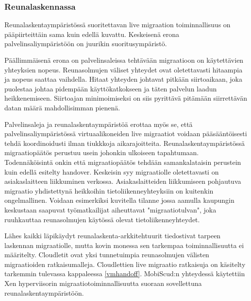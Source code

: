 \subsubsection*{Reunalaskennassa}
Reunalaskentaympäristössä suoritettavan live migraation toiminnallisuus on pääpiirteittäin sama kuin edellä kuvattu. Keskeisenä erona palvelinsaliympäristöön on juurikin suoritusympäristö. 

Päällimmäisenä erona on palvelinsaleissa tehtävään migraatioon on käytettävien yhteyksien nopeus. Reunasolmujen väliset yhteydet ovat oletettavasti hitaampia ja nopeus saattaa vaihdella\cite{ha2017you}.
Hitaat yhteyden johtavat pitkään siirtoaikaan, joka puolestaa johtaa pidempään käyttökatkokseen ja täten palvelun laadun heikkenemiseen.
Siirtoajan minimoimiseksi on siis pyrittävä pitämään siirrettävän datan määrä mahdollisimman pienenä.



Palvelinsaleja ja reunalaskentaympäristöä erottaa myös se, että palvelinsaliympäristössä virtuaalikoneiden live migraatiot voidaan pääsääntöisesti tehdä koordinoidusti ilman tiukkkoja aikarajoitteita. 
Reunalaskentaympäristössä migraatiopäätös perustuu usein johonkin ulkoiseen tapahtumaan. Todennäköisintä onkin että migraatiopäätös tehdään samankalataisin perustein kuin edellä esitelty handover. Keskeisin syy migraatiolle oletettavasti on asiakaslaitteen liikkuminen verkossa. Asiakaslaitteiden liikkumiseen pohjautuva migraatio yhdistettynä heikkoihin tietoliikenneyhteyksiin on kuitenkin ongelmallinen. Voidaan esimerkiksi kuvitella tilanne jossa aamulla kaupungin keskustaan saapuvat työmatkailijat aiheuttavat "migraatiotulvan", joka ruuhkauttaa reunasolmujen käytössä olevat tietoliikenneyhteydet.


Lähes kaikki läpikäydyt reunalaskenta-arkkitehtuurit tiedostivat tarpeen laskennan migraatiolle, mutta kovin monessa sen tarkempaa toiminnallisuutta ei määritelty.
Cloudletit ovat yksi tunnetuimpia reunasolmujen välisten migraatioiden ratkaisumalleja. Cloudlettien live migraatio ratkaisuja on käsitelty tarkemmin tulevassa kappaleessa \ref{vmhandoff}. 
MobiScud:n yhteydessä käytettiin Xen hyperviisorin migraatiotoiminnallisuutta suoraan sovellettuna reunalaskentaympäristöön\cite{wang2015mobiscud}.